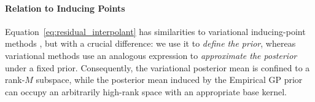 \documentclass{article}
\newcommand{\bX}{\mathbf{X}}
\begin{document}
\paragraph{Relation to Inducing Points}
Equation~\eqref{eq:residual_interpolant} has similarities to variational
inducing-point methods \citep{titsias2009variational}, but with a crucial
difference: we use it to \emph{define the prior}, whereas variational methods
use an analogous expression to \emph{approximate the posterior} under a fixed
prior. Consequently, the variational posterior mean is confined to a rank-$M$
subspace, while the posterior mean induced by the Empirical GP prior can occupy an
arbitrarily high-rank space with an appropriate base kernel.

\end{document}
